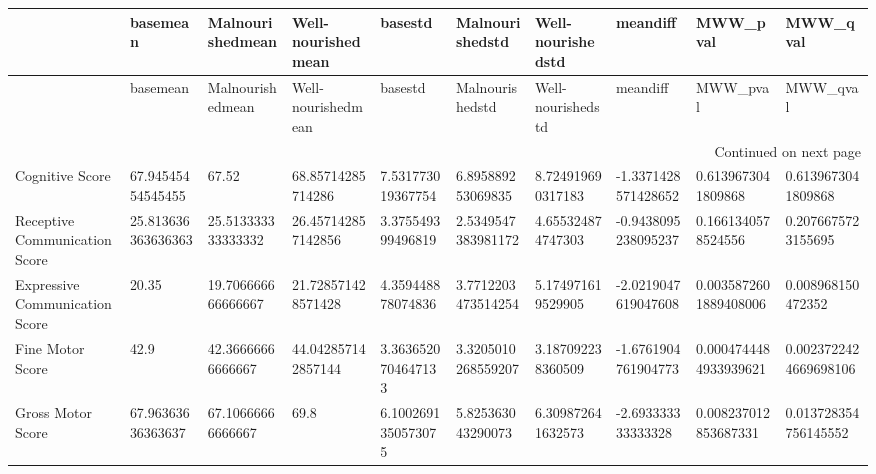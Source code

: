 \begin{longtable}{llllllllll}
\toprule
{} &            basemean &    Malnourishedmean &  Well-nourishedmean &             basestd &     Malnourishedstd &  Well-nourishedstd &             meandiff &               MWW\_pval &               MWW\_qval \\
\midrule
\endfirsthead

\toprule
{} &            basemean &    Malnourishedmean &  Well-nourishedmean &             basestd &     Malnourishedstd &  Well-nourishedstd &             meandiff &               MWW\_pval &               MWW\_qval \\
\midrule
\endhead
\midrule
\multicolumn{10}{r}{{Continued on next page}} \\
\midrule
\endfoot

\bottomrule
\endlastfoot
Cognitive Score                &   67.94545454545455 &               67.52 &   68.85714285714286 &   7.531773019367754 &   6.895889253069835 &  8.724919690317183 &  -1.3371428571428652 &     0.6139673041809868 &     0.6139673041809868 \\
Receptive Communication Score  &  25.813636363636363 &  25.513333333333332 &  26.457142857142856 &   3.375549399496819 &  2.5349547383981172 &  4.655324874747303 &  -0.9438095238095237 &     0.1661340578524556 &     0.2076675723155695 \\
Expressive Communication Score &               20.35 &  19.706666666666667 &  21.728571428571428 &   4.359448878074836 &  3.7712203473514254 &  5.174971619529905 &  -2.0219047619047608 &  0.0035872601889408006 &      0.008968150472352 \\
Fine Motor Score               &                42.9 &   42.36666666666667 &  44.042857142857144 &  3.3636520704647133 &  3.3205010268559207 &  3.187092238360509 &  -1.6761904761904773 &  0.0004744484933939621 &  0.0023722424669698106 \\
Gross Motor Score              &   67.96363636363637 &   67.10666666666667 &                69.8 &  6.1002691350573075 &   5.825363043290073 &  6.309872641632573 &   -2.693333333333328 &   0.008237012853687331 &   0.013728354756145552 \\
\end{longtable}
